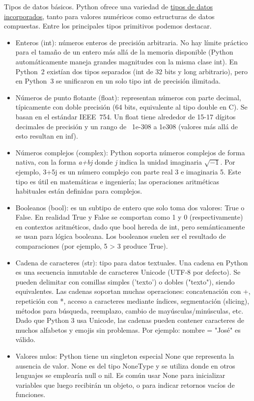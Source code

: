 Tipos de datos básicos. Python ofrece una variedad de \href{https://docs.python.org/3/library/stdtypes.html}{tipos de datos incorporados}, 
tanto para valores numéricos como estructuras de datos compuestas. Entre los principales 
tipos primitivos podemos destacar.

\begin{itemize}
\item Enteros (int): números enteros de precisión arbitraria. No hay límite práctico para el tamaño de un entero más allá de la memoria disponible (Python automáticamente maneja grandes magnitudes con la misma clase int). En Python 2 existían dos tipos separados (int de 32 bits y long arbitrario), pero en Python 3 se unificaron en un solo tipo int de precisión ilimitada.
\item Números de punto flotante (float): representan números con parte decimal, típicamente con doble precisión (64 bits, equivalente al tipo double en C). Se basan en el estándar IEEE 754. Un float tiene alrededor de 15-17 dígitos decimales de precisión y un rango de ~1e-308 a 1e308 (valores más allá de esto resultan en inf).
\item Números complejos (complex): Python soporta números complejos de forma nativa, con la forma \textit{a+bj} donde \textit{j} indica la unidad imaginaria $\sqrt{-1}$. Por ejemplo, 3+5j es un número complejo con parte real 3 e imaginaria 5. Este tipo es útil en matemáticas e ingeniería; las operaciones aritméticas habituales están definidas para complejos.
\item Booleanos (bool): es un subtipo de entero que solo toma dos valores: True o False. En realidad True y False se comportan como 1 y 0 (respectivamente) en contextos aritméticos, dado que bool hereda de int, pero semánticamente se usan para lógica booleana. Los booleanos suelen ser el resultado de comparaciones (por ejemplo, 5 > 3 produce True).
\item Cadena de caracteres (str): tipo para datos textuales. Una cadena en Python es una secuencia inmutable de caracteres Unicode (UTF-8 por defecto). Se pueden delimitar con comillas simples ('texto') o dobles ("texto"), siendo equivalentes. Las cadenas soportan muchas operaciones: concatenación con +, repetición con *, acceso a caracteres mediante índices, segmentación (slicing), 
métodos para búsqueda, reemplazo, cambio de mayúsculas/minúsculas, etc. Dado que Python 3 usa Unicode, las cadenas pueden contener caracteres de muchos alfabetos y emojis sin problemas. Por ejemplo: nombre = "José" es válido.
\item Valores nulos: Python tiene un singleton especial None que representa la ausencia de valor. None es del tipo NoneType y se utiliza donde en otros lenguajes se emplearía null o nil. Es común usar None para inicializar variables que luego recibirán un objeto, o para indicar retornos vacíos de funciones.

\end{itemize}

